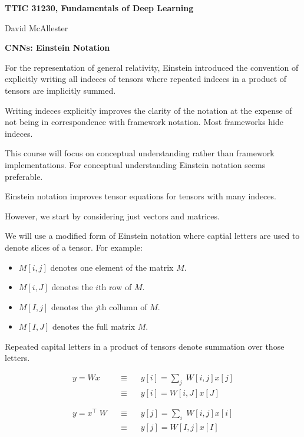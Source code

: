 




{\Huge
  
  \centerline{\bf TTIC 31230, Fundamentals of Deep Learning}
  \bigskip
  \centerline{David McAllester}
  \vfill
  \vfill
  \centerline{\bf CNNs: Einstein Notation}
  \vfill
  \vfill
  \vfill



For the representation of general relativity, Einstein introduced the convention of explicitly writing all indeces of tensors where repeated indeces in a product of tensors are implicitly summed.

\vfill
Writing indeces explicitly improves the clarity of the notation at the expense of not being in correspondence with framework notation.  Most frameworks hide indeces.

\vfill
This course will focus on conceptual understanding rather than framework implementations.  For conceptual understanding Einstein notation seems preferable.



Einstein notation improves tensor equations for tensors with many indeces.

\vfill
However, we start by considering just vectors and matrices.

\vfill
We will use a modified form of Einstein notation where captial letters are used to denote slices of a tensor.  For example:

\vfill
\begin{itemize}
\item $M[i,j]$ denotes one element of the matrix $M$.
\item $M[i,J]$ denotes the $i$th row of $M$.
\item $M[I,j]$ denotes the $j$th collumn of $M$.
\item $M[I,J]$ denotes the full matrix $M$.
\end{itemize}

Repeated capital letters in a product of tensors denote summation over those letters.

\vfill
\begin{eqnarray*}
y = Wx &\;\;\;\equiv\;\;\; & y[i] = \sum_j \;W[i,j]x[j] \\
& \;\;\;\equiv \;\;\; & y[i] = W[i,J]x[J] \\
\\
\\
y = x^\top\;W & \;\;\;\equiv \;\;\; & y[j] = \sum_i \;W[i,j]x[i] \\
& \;\;\;\equiv \;\;\; & y[j] = W[I,j]x[I]
\end{eqnarray*}

}
